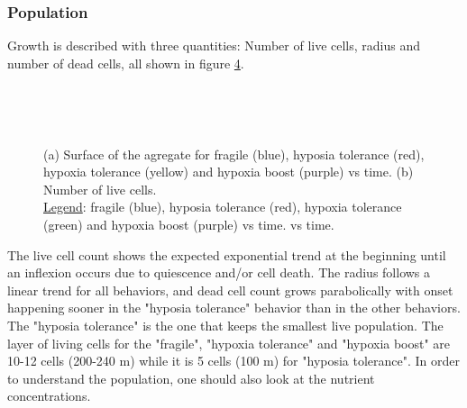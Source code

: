 \documentclass[11pt,a4paper]{article}
\begin{document}
\subsubsection{Population}
Growth is described with three quantities: Number of live cells, radius and number of dead cells, all shown in figure \ref{OS_numbers_Id}.\\
\begin{figure}[h]
\begin{subfigure}{0.32\textwidth}
	\centering
	
	\caption{ \label{OS_live_Id}}
\end{subfigure}
~~
\begin{subfigure}{0.32\textwidth}
	\centering
	
	\caption{\label{OS_Rad_Id}}
\end{subfigure}
~~
\begin{subfigure}{0.32\textwidth}
	\centering
	
	\caption{\label{OS_dead_Id}}
\end{subfigure}
\caption{(a) Surface of the agregate for fragile (blue), hyposia tolerance (red), hypoxia tolerance (yellow) and hypoxia boost (purple) vs time. (b) Number of live cells.\\
\underline{Legend}: fragile (blue), hyposia tolerance (red), hypoxia tolerance (green) and hypoxia boost (purple) vs time. vs time. \label{OS_numbers_Id}}
\end{figure}


The live cell count shows the expected exponential trend at the beginning until an inflexion occurs due to quiescence and/or cell death. The radius follows a linear trend for all behaviors, and dead cell count grows parabolically with onset happening sooner in the "hyposia tolerance" behavior than in the other behaviors. The "hyposia tolerance" is the one that keeps the smallest live population. The layer of living cells for the "fragile", "hypoxia tolerance" and "hypoxia boost" are 10-12 cells (200-240 \textmu m) while it is 5 cells (100 \textmu m) for "hyposia tolerance". In order to understand the population, one should also look at the nutrient concentrations.\\
\end{document}
